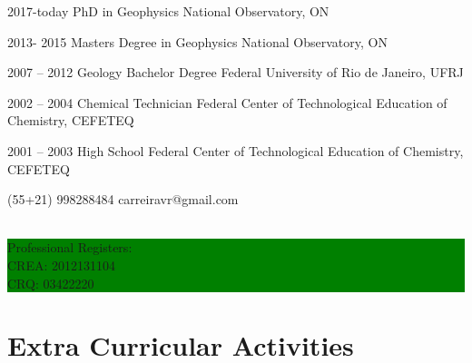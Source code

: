 \documentclass{tccv}
\begin{document}
\begin{yearlist}
	
	\item{2017-today} 
	      {PhD in Geophysics}
	      {National Observatory, ON}

\item{2013- 2015}
     {Masters Degree in Geophysics}
     {National Observatory, ON}

\item{2007 -- 2012}
     {Geology Bachelor Degree}
     {Federal University of Rio de Janeiro, UFRJ}

\item{2002 -- 2004}
     {Chemical Technician}
     {Federal Center of Technological Education of Chemistry, CEFETEQ}

\item{2001 -- 2003}
     {High School}
     {Federal Center of Technological Education of Chemistry, CEFETEQ}

\end{yearlist}
    {(55+21) 998288484}
    {carreiravr@gmail.com}
    \\ \\
\colorbox{green}{
\begin{minipage}{0.95\linewidth}
    Professional Registers:\\
    CREA: 2012131104\\
    CRQ: 03422220
\end{minipage}
}

\section{Extra Curricular Activities}
\end{document}
